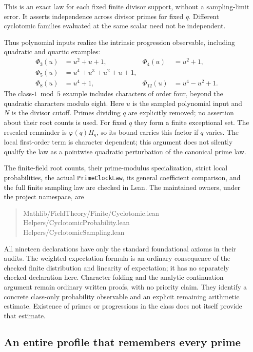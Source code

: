 \documentclass[11pt]{article}
\theoremstyle{definition}
\begin{document}
This is an exact law for each fixed finite divisor support, without a
sampling-limit error. It asserts independence across divisor primes for
fixed $q$. Different cyclotomic families evaluated at the same scalar
need not be independent.

Thus polynomial inputs realize the intrinsic progression observable,
including quadratic and quartic examples:
\[
 \begin{aligned}
 \Phi_3(u)&=u^2+u+1,& \Phi_4(u)&=u^2+1,\\
 \Phi_5(u)&=u^4+u^3+u^2+u+1,\\
 \Phi_8(u)&=u^4+1,& \Phi_{12}(u)&=u^4-u^2+1.
 \end{aligned}
\]
The class-$1\bmod5$ example includes characters of order four, beyond the
quadratic characters modulo eight. Here $u$ is the sampled polynomial
input and $N$ is the divisor cutoff. Primes dividing $q$ are explicitly
removed; no assertion about their root counts is used. For fixed $q$ they
form a finite exceptional set. The rescaled remainder is
$\varphi(q)H_q$, so its bound carries this factor if $q$ varies.
The local first-order term is character dependent; this argument does not
silently qualify the law as a pointwise quadratic perturbation of the
canonical prime law.

The finite-field root counts, their prime-modulus specialization, strict
local probabilities, the actual \texttt{PrimeClockLaw}, its general
coefficient comparison, and the full finite sampling law are checked in
Lean. The maintained owners, under the project namespace, are
\begin{quote}\small\ttfamily
Mathlib/FieldTheory/Finite/Cyclotomic.lean\\
Helpers/CyclotomicProbability.lean\\
Helpers/CyclotomicSampling.lean
\end{quote}
All nineteen declarations have only the standard foundational axioms
in their audits. The weighted expectation formula is an ordinary
consequence of the checked finite distribution and linearity of
expectation; it has no separately checked declaration here.
Character folding and the analytic continuation argument remain ordinary
written proofs, with no priority claim. They identify a concrete class-only
probability observable and an explicit remaining arithmetic estimate.
Existence of primes or progressions in the class does not itself provide
that estimate.

\subsection{An entire profile that remembers every prime}
\end{document}
